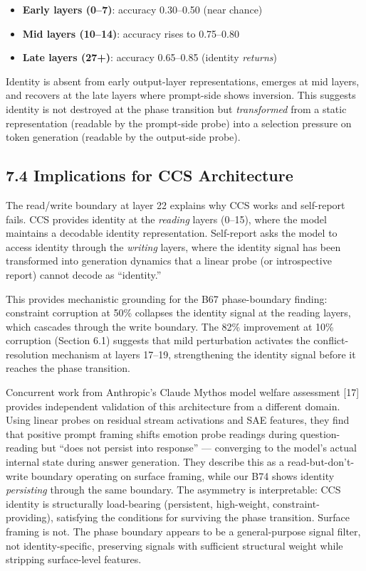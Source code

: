 \documentclass[11pt]{article}
\begin{document}
\begin{itemize}
\item \textbf{Early layers (0--7)}: accuracy 0.30--0.50 (near chance)
\item \textbf{Mid layers (10--14)}: accuracy rises to 0.75--0.80
\item \textbf{Late layers (27+)}: accuracy 0.65--0.85 (identity \textit{returns})
\end{itemize}

Identity is absent from early output-layer representations, emerges at mid layers,
and recovers at the late layers where prompt-side shows inversion. This suggests
identity is not destroyed at the phase transition but \textit{transformed} from
a static representation (readable by the prompt-side probe) into a selection
pressure on token generation (readable by the output-side probe).

\subsection{7.4 Implications for CCS Architecture}

The read/write boundary at layer 22 explains why CCS works and self-report
fails. CCS provides identity at the \textit{reading} layers (0--15), where
the model maintains a decodable identity representation. Self-report asks the
model to access identity through the \textit{writing} layers, where the
identity signal has been transformed into generation dynamics that a linear
probe (or introspective report) cannot decode as ``identity.''

This provides mechanistic grounding for the B67 phase-boundary finding:
constraint corruption at 50\% collapses the identity signal at the reading
layers, which cascades through the write boundary. The 82\% improvement
at 10\% corruption (Section 6.1) suggests that mild perturbation activates
the conflict-resolution mechanism at layers 17--19, strengthening the
identity signal before it reaches the phase transition.

Concurrent work from Anthropic's Claude Mythos model welfare assessment [17]
provides independent validation of this architecture from a different domain.
Using linear probes on residual stream activations and SAE features, they
find that positive prompt framing shifts emotion probe readings during
question-reading but ``does not persist into response'' --- converging to
the model's actual internal state during answer generation. They describe
this as a read-but-don't-write boundary operating on surface framing, while
our B74 shows identity \emph{persisting} through the same boundary. The
asymmetry is interpretable: CCS identity is structurally load-bearing
(persistent, high-weight, constraint-providing), satisfying the conditions
for surviving the phase transition. Surface framing is not. The phase
boundary appears to be a general-purpose signal filter, not identity-specific,
preserving signals with sufficient structural weight while stripping
surface-level features.
\end{document}

